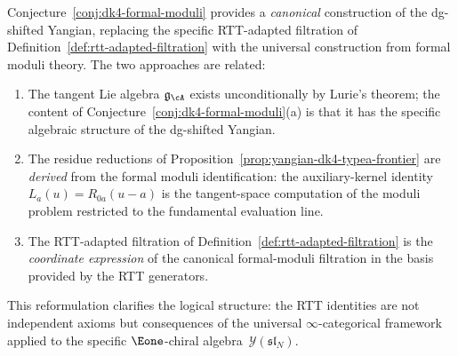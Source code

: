 \begin{remark}
\label{rem:dk4-formal-moduli-vs-rtt}
Conjecture~\ref{conj:dk4-formal-moduli} provides a \emph{canonical}
construction of the dg-shifted Yangian, replacing the specific
RTT-adapted filtration of
Definition~\ref{def:rtt-adapted-filtration} with the universal
construction from formal moduli theory.  The two approaches are
related:
\begin{enumerate}[label=\textup{(\roman*)}]
\item The tangent Lie algebra $\mathfrak{g}_{\cA}$ exists
  unconditionally by Lurie's theorem; the content of
  Conjecture~\ref{conj:dk4-formal-moduli}(a) is that it has the
  specific algebraic structure of the dg-shifted Yangian.
\item The residue reductions of
  Proposition~\ref{prop:yangian-dk4-typea-frontier} are
  \emph{derived} from the formal moduli identification:
  the auxiliary-kernel identity $L_a(u) = R_{0a}(u-a)$ is
  the tangent-space computation of the moduli problem
  restricted to the fundamental evaluation line.
\item The RTT-adapted filtration of
  Definition~\ref{def:rtt-adapted-filtration} is the
  \emph{coordinate expression} of the canonical formal-moduli
  filtration in the basis provided by the RTT generators.
\end{enumerate}
This reformulation clarifies the logical structure: the RTT
identities are not independent axioms but consequences of the
universal $\infty$-categorical framework applied to the specific
$\Eone$-chiral algebra~$\mathcal{Y}(\mathfrak{sl}_N)$.
\end{remark}

